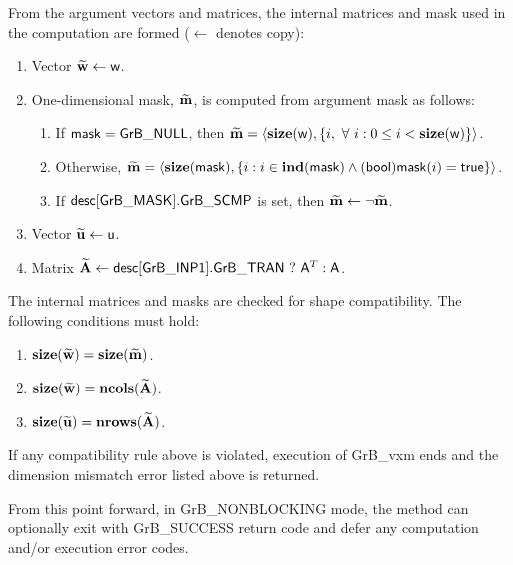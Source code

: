 From the argument vectors and matrices, the internal matrices and mask used in 
the computation are formed ($\leftarrow$ denotes copy):
\begin{enumerate}
	\item Vector ${\bf \widetilde{w}} \leftarrow {\sf w}$.

	\item One-dimensional mask, ${\bf \widetilde{m}}$, is computed from 
    argument {\sf mask} as follows:
	\begin{enumerate}
		\item	If ${\sf mask} = {\sf GrB\_NULL}$, then ${\bf \widetilde{m}} = 
        \langle \bold{size}({\sf w}), \{i, \ \forall \ i : 0 \leq i < 
        \bold{size}({\sf w}) \} \rangle$.

		\item	Otherwise, ${\bf \widetilde{m}} = 
        \langle \bold{size}({\sf mask}), \{i : i \in \bold{ind}({\sf mask}) \wedge
        ({\sf bool}){\sf mask}(i) = {\sf true} \} \rangle$.

		\item	If ${\sf desc[GrB\_MASK].GrB\_SCMP}$ is set, then 
        ${\bf \widetilde{m}} \leftarrow \neg {\bf \widetilde{m}}$.
	\end{enumerate}

	\item Vector ${\bf \widetilde{u}} \leftarrow {\sf u}$.

	\item Matrix ${\bf \widetilde{A}} \leftarrow {\sf desc[GrB\_INP1].GrB\_TRAN} \ ? \ {\sf A}^T : {\sf A}$.
\end{enumerate}

The internal matrices and masks are checked for shape compatibility. The following 
conditions must hold:
\begin{enumerate}
	\item $\bold{size}({\bf \widetilde{w}}) = \bold{size}({\bf \widetilde{m}})$.

	\item $\bold{size}({\bf \widetilde{w}}) = \bold{ncols}({\bf \widetilde{A}})$.

	\item $\bold{size}({\bf \widetilde{u}}) = \bold{nrows}({\bf \widetilde{A}})$.
\end{enumerate}
If any compatibility rule above is violated, execution of {\sf GrB\_vxm} ends and 
the dimension mismatch error listed above is returned.

From this point forward, in {\sf GrB\_NONBLOCKING} mode, the method can 
optionally exit with {\sf GrB\_SUCCESS} return code and defer any computation 
and/or execution error codes.

